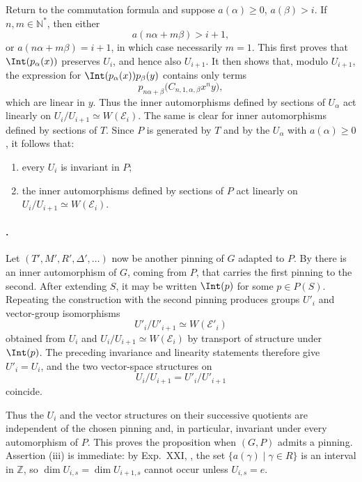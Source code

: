 Return to the commutation formula and suppose
\(a(\alpha)\geq0\), \(a(\beta)>i\).  If \(n,m\in\mathbb N^*\), then
either
\[
 a(n\alpha+m\beta)>i+1,
\]
or \(a(n\alpha+m\beta)=i+1\), in which case necessarily \(m=1\).
This first proves that \(\Int(p_\alpha(x))\) preserves \(U_i\), and hence
also \(U_{i+1}\).  It then shows that, modulo \(U_{i+1}\), the expression
for \(\Int(p_\alpha(x))p_\beta(y)\) contains only terms
\[
 p_{n\alpha+\beta}
 \bigl(C_{n,1,\alpha,\beta}x^ny\bigr),
\]
which are linear in \(y\).  Thus the inner automorphisms defined by
sections of \(U_\alpha\) act linearly on
\(U_i/U_{i+1}\simeq W(\mathcal E_i)\).  The same is clear for inner
automorphisms defined by sections of \(T\).  Since \(P\) is generated by
\(T\) and by the \(U_\alpha\) with \(a(\alpha)\geq0\), it follows that:
\begin{enumerate}[label=\textup{(\roman*)}]
\item every \(U_i\) is invariant in \(P\);
\item the inner automorphisms defined by sections of \(P\) act linearly on
\(U_i/U_{i+1}\simeq W(\mathcal E_i)\).
\end{enumerate}

\paragraph{.}
Let \((T',M',R',\Delta',\ldots)\) now be another pinning of \(G\) adapted
to \(P\).  By  there is an inner automorphism of \(G\), coming from
\(P\), that carries the first pinning to the second.  After extending
\(S\), it may be written \(\Int(p)\) for some \(p\in P(S)\).
Repeating the construction with the second pinning produces groups
\(U'_i\) and vector-group isomorphisms
\[
 U'_i/U'_{i+1}\simeq W(\mathcal E'_i)
\]
obtained from \(U_i\) and
\(U_i/U_{i+1}\simeq W(\mathcal E_i)\) by transport of structure under
\(\Int(p)\).  The preceding invariance and linearity statements therefore
give \(U'_i=U_i\), and the two vector-space structures on
\[
 U_i/U_{i+1}=U'_i/U'_{i+1}
\]
coincide.

Thus the \(U_i\) and the vector structures on their successive quotients
are independent of the chosen pinning and, in particular, invariant under
every automorphism of \(P\).  This proves the proposition when \((G,P)\)
admits a pinning.  Assertion (iii) is immediate: by Exp.\ XXI, , the
set \(\{a(\gamma)\mid\gamma\in R\}\) is an interval in \(\mathbb Z\), so
\(\dim U_{i,s}=\dim U_{i+1,s}\) cannot occur unless \(U_{i,s}=e\).

